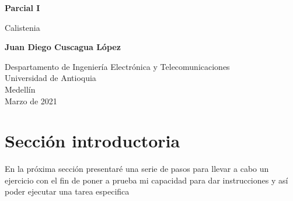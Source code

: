 \documentclass{article}
\begin{document}
\begin{titlepage}
    \begin{center}
        \vspace*{1cm}
            
        \Huge
        \textbf{Parcial I}
            
        \vspace{0.5cm}
        \LARGE
        Calistenia
            
        \vspace{1.5cm}
            
        \textbf{Juan Diego Cuscagua López}
            
        \vfill
            
        \vspace{0.8cm}
            
        \Large
        Despartamento de Ingeniería Electrónica y Telecomunicaciones\\
        Universidad de Antioquia\\
        Medellín\\
        Marzo de 2021
            
    \end{center}
\end{titlepage}

\tableofcontents
\newpage
\section{Sección introductoria}\label{intro}
En la próxima sección presentaré una serie de pasos para llevar a cabo un ejercicio con el fin de poner a prueba mi capacidad para dar instrucciones y así poder ejecutar una tarea especifica
\end{document}
